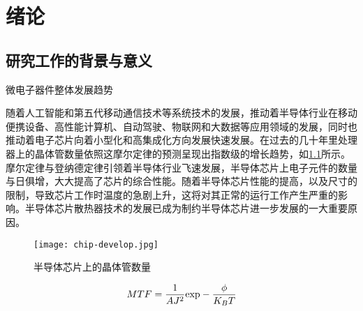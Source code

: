     
\chapter{绪\quad 论}
\section{研究工作的背景与意义}

\begin{shaded}
    微电子器件整体发展趋势  
    \end{shaded}
    随着人工智能和第五代移动通信技术等系统技术的发展，推动着半导体行业在移动便携设备、高性能计算机、自动驾驶、物联\cite{lau_recent_2022}网和大数据等应用领域的发展\cite{lau_recent_2022}，同时也推动着电子芯片向着小型化和高集成化方向发展快速发展\cite{sadique_heat_2022}。在过去的几十年里处理器上的晶体管数量依照这摩尔定律\cite{moore_cramming_1965}的预测呈现出指数级的增长趋势，如\cref{chip-develop}所示。摩尔定律与登纳德定律\cite{dennard_design_1974}引领着半导体行业飞速发展，半导体芯片上电子元件的数量与日俱增，大大提高了芯片的综合性能。随着半导体芯片性能的提高，以及尺寸的限制，导致芯片工作时温度的急剧上升，这将对其正常的运行工作产生严重的影响。半导体芯片散热器技术的发展已成为制约半导体芯片进一步发展的一大重要原因。

    \begin{figure}[h]
        \texttt{[image: chip-develop.jpg]}
        \caption{半导体芯片上的晶体管数量}
        \label{chip-develop}
        \end{figure}



    \begin{equation}
        MTF = \frac{1}{{A{J^2}}}{\rm{exp}} - \frac{\phi }{{{K_B}T}}
        \label{MTF}
        \end{equation}



